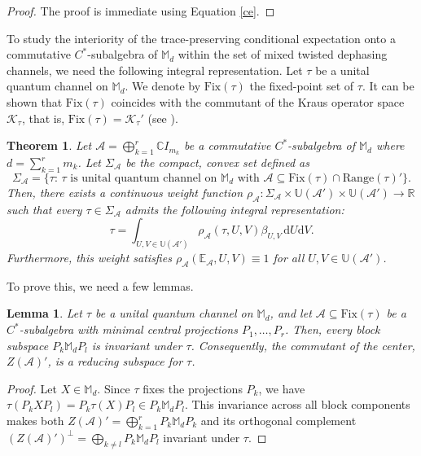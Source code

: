 \documentclass[11pt,reqno]{amsart}
\theoremstyle{definition}
\theoremstyle{plain}
\newtheorem{thm}[defn]{Theorem}
\newtheorem{lem}[defn]{Lemma}
\theoremstyle{remark}
\numberwithin{equation}{section}%
\begin{document}
\begin{proof}
	The proof is immediate using Equation \ref{ce}.
\end{proof}


To study the interiority of the trace-preserving conditional expectation onto a commutative $C^*$-subalgebra of $\mathbb{M}_d$ within the set of mixed twisted dephasing channels, we need the following integral representation. Let $\tau$ be a unital quantum channel on $\mathbb{M}_d$. We denote by $\mathrm{Fix}(\tau)$ the fixed-point set of $\tau$. It can be shown that $\mathrm{Fix}(\tau)$ coincides with the commutant of the Kraus operator space $\mathscr{K}_\tau$, that is, $\mathrm{Fix}(\tau)=\mathscr{K}_\tau'$ (see \cite[Theorem 2.1]{DK}). 


\begin{thm}\label{EMD:thm2}
	Let $\mathcal{A} = \bigoplus_{k=1}^r \mathbb{C}I_{m_k}$ be a commutative $C^*$-subalgebra of $\mathbb{M}_d$ where $d = \sum_{k=1}^r m_k$. Let $\Sigma_{\mathcal{A}}$ be the compact, convex set defined as \[\Sigma_{\mathcal{A}}=\{\tau:\, \tau\text{ is unital quantum channel on }\mathbb{M}_d\text{ with }\mathcal{A}\subseteq\text{Fix}(\tau)\cap \text{Range}(\tau)'\}.\]  Then, there exists a continuous weight function $\rho_{\mathcal{A}}: \Sigma_{\mathcal{A}} \times \mathbb{U}(\mathcal{A}') \times \mathbb{U}(\mathcal{A}') \to \mathbb{R}$ such that every $\tau \in \Sigma_{\mathcal{A}}$ admits the following integral representation:
	\[
	\tau = \int_{U,V \in \mathbb{U}(\mathcal{A}')} \rho_{\mathcal{A}}(\tau, U, V) \beta_{U,V} \, \mathrm{d}U\mathrm{d}V.
	\]
	Furthermore, this weight satisfies $\rho_{\mathcal{A}}(\mathbb{E}_{\mathcal{A}}, U, V) \equiv 1$ for all $U,V \in \mathbb{U}(\mathcal{A}')$.
\end{thm}


To prove this, we need a few lemmas.



\begin{lem}\label{EMD:lem5}
	Let $\tau$ be a unital quantum channel on $\mathbb{M}_d$, and let $\mathcal{A} \subseteq \text{Fix}(\tau)$ be a $C^*$-subalgebra with minimal central projections $P_1, \dots, P_r$. Then, every block subspace $P_k \mathbb{M}_d P_l$ is invariant under $\tau$. Consequently, the commutant of the center, $Z(\mathcal{A})'$, is a reducing subspace for $\tau$.
\end{lem}


\begin{proof}
	Let $X\in\mathbb{M}_d$. Since $\tau$ fixes the projections $P_k$, we have $\tau(P_k X P_l) = P_k \tau(X) P_l \in P_k \mathbb{M}_d P_l$. This invariance across all block components makes both $Z(\mathcal{A})' = \bigoplus_{k=1}^r P_k \mathbb{M}_d P_k$ and its orthogonal complement ${(Z(\mathcal{A})')}^\perp= \bigoplus_{k\neq l} P_k \mathbb{M}_d P_l$ invariant under $\tau$.
\end{proof}
\end{document}
